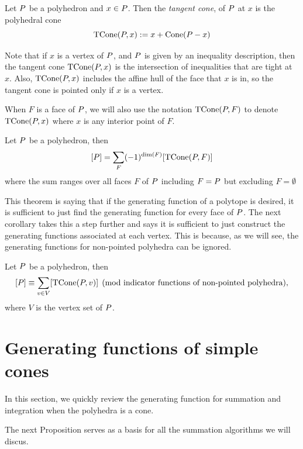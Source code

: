 \begin{definition} 
Let ${ P}$ be a polyhedron and $x \in { P}$. Then the \emph{tangent cone}, of ${ P}$ at $x$ is the polyhedral cone 
\[\operatorname{TCone}({ P}, x) := x + \operatorname{Cone}({ P} - x)\]  
\end{definition} 
 
Note that if $x$ is a vertex of ${ P}$, and ${ P}$ is given by an inequality description, then the tangent cone $\operatorname{TCone}({ P}, x)$ is the intersection of inequalities that are tight at $x$. Also, $\operatorname{TCone}({ P}, x)$ includes the affine hull of the face that $x$ is in, so the tangent cone is pointed only if $x$ is a vertex. 

When $F$ is a face of ${ P}$, we will also use the notation $\operatorname{TCone}({ P}, F)$ to denote $\operatorname{TCone}({ P}, x)$ where $x$ is any interior point of $F$.

\begin{theorem}
Let ${ P}$ be a polyhedron, then 
\[[{ P}] = \sum_{F} (-1)^{\dim(F)}[\operatorname{TCone}({ P}, F)] \]
where the sum ranges over all faces $F$ of ${ P}$ including $F = { P}$ but excluding $F = \emptyset$
\end{theorem} 

This theorem is saying that if the generating function of a polytope is desired, it is sufficient to just find the generating function for every face of ${ P}$. The next
 corollary takes this a step further and says it is sufficient to just construct the generating functions associated at each vertex. This is because, as we will see, the generating functions for non-pointed polyhedra can be ignored.
 
\begin{cor}
\label{cor:tcone-mod-lines}
Let ${ P}$ be a polyhedron, then 
\[ [{ P}] \equiv \sum_{v \in V} [\operatorname{TCone}({ P}, v)] \pmod{\text{indicator functions of non-pointed polyhedra}},\]
where $V$ is the vertex set of ${ P}$.
\end{cor}

\section{Generating functions of simple cones}

In this section, we quickly review the generating function for summation and integration when the polyhedra is a cone. 
 
The next Proposition serves as a basis for all the summation algorithms we will discus. 

